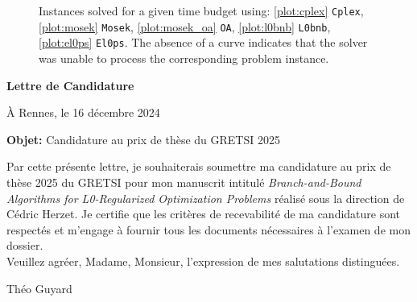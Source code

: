 \documentclass[11pt]{article}
\begin{document}
\begin{figure}[!ht]
    \centering
    
    \vspace*{-0.5cm}
    \caption{Instances solved for a given time budget using: \ref{plot:cplex} \texttt{Cplex}, \ref{plot:mosek} \texttt{Mosek}, \ref{plot:mosek_oa} \texttt{OA}, \ref{plot:l0bnb} \texttt{L0bnb}, \ref{plot:el0ps} \texttt{El0ps}. The absence of a curve indicates that the solver was unable to process the corresponding problem instance.}
    \label{fig:perfprofiles}
\end{figure}


{
    \small
    
}


\clearpage

\thispagestyle{empty}

\vspace*{150pt}
\begin{center}
    \LARGE\bf{Lettre de Candidature}
\end{center}
\vspace*{50pt}
\begin{flushright}
    À Rennes, le 16 décembre 2024
\end{flushright}
\vspace*{20pt}
\textbf{Objet:} Candidature au prix de thèse du GRETSI 2025

\vspace*{20pt}

Par cette présente lettre, je souhaiterais soumettre ma candidature au prix de thèse 2025 du GRETSI pour mon manuscrit intitulé \textit{Branch-and-Bound Algorithms for L0-Regularized Optimization Problems} réalisé sous la direction de Cédric Herzet.
Je certifie que les critères de recevabilité de ma candidature sont respectés et m'engage à fournir tous les documents nécessaires à l'examen de mon dossier.
~\\

Veuillez agréer, Madame, Monsieur, l'expression de mes salutations distinguées.

\vspace*{50pt}
\begin{flushright}
    Théo Guyard
\end{flushright}
\end{document}

